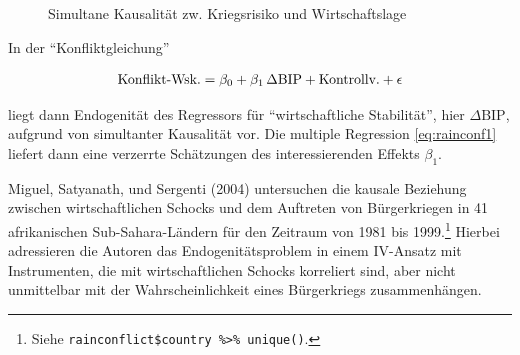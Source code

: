 \documentclass[
  a4paper,
  DIV=11,
  oneside]{scrreprt}
\begin{document}
\begin{figure}[t]


\caption{\label{fig-IVDAGrain1}Simultane Kausalität zw. Kriegsrisiko und
Wirtschaftslage}

\end{figure}%

In der ``Konfliktgleichung''

\begin{align}
  \textup{Konflikt-Wsk.} = \beta_0 + \beta_1\, \Delta\text{BIP} + \text{Kontrollv.} + \epsilon\label{eq:rainconf1}
\end{align}

liegt dann Endogenität des Regressors für ``wirtschaftliche
Stabilität'', hier \(\Delta\text{BIP}\), aufgrund von simultanter
Kausalität vor. Die multiple Regression \eqref{eq:rainconf1} liefert
dann eine verzerrte Schätzungen des interessierenden Effekts
\(\beta_1\).

Miguel, Satyanath, und Sergenti (2004) untersuchen die kausale Beziehung
zwischen wirtschaftlichen Schocks und dem Auftreten von Bürgerkriegen in
41 afrikanischen Sub-Sahara-Ländern für den Zeitraum von 1981 bis
1999.\footnote{Siehe
  \texttt{rainconflict\$country\ \%\textgreater{}\%\ unique()}.} Hierbei
adressieren die Autoren das Endogenitätsproblem in einem IV-Ansatz mit
Instrumenten, die mit wirtschaftlichen Schocks korreliert sind, aber
nicht unmittelbar mit der Wahrscheinlichkeit eines Bürgerkriegs
zusammenhängen.
\end{document}
